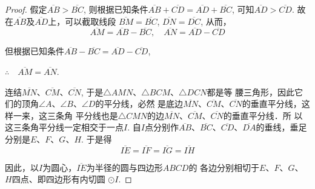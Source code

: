 \begin{figure}[htp]
    \centering
{}
    \caption{}
\end{figure}


\begin{proof}
    假定$\overline{AB}>\overline{BC}$, 则根据已知条件$\overline{AB}+\overline{CD}=\overline{AD}+
    \overline{BC}$, 可知$\overline{AD}>\overline{CD}$. 故在$\overline{AB}$及$\overline{AD}$上，可以截取线段
    $\overline{BM}=\overline{BC}$, $\overline{DN}=\overline{DC}$, 从而，
\[\overline{AM}=\overline{AB}-\overline{BC},\quad \overline{AN}=\overline{AD}-\overline{CD}\]

但根据已知条件$\overline{AB}-\overline{BC}=\overline{AD}-\overline{CD}$, 

$\therefore\quad \overline{AM}=\overline{AN}$.

连结$\overline{MN}$、$\overline{CM}$、$\overline{CN}$, 于是$\triangle AMN$、$\triangle BCM$、$\triangle DCN$都是等
腰三角形，因此它们的顶角$\angle A$、$\angle B$、$\angle D$的平分线，必然
是底边$\overline{MN}$、$\overline{CM}$、$\overline{CN}$的垂直平分线，这样一来，这三条角
平分线也是$\triangle CMN$的边$\overline{MN}$、$\overline{CM}$、$\overline{CN}$的垂直平分线．所
以这三条角平分线一定相交于一点$I$. 自$I$点分别作$\overline{AB}$、$\overline{BC}$、$\overline{CD}$、$\overline{DA}$的垂线，垂足分别是$E$、$F$、$G$、$H$. 于是得
\[\overline{IE}=\overline{IF}=\overline{IG}=\overline{IH}\]

因此，以$I$为圆心，$\overline{IE}$为半径的圆与四边形$ABCD$的
各边分别相切于$E$、$F$、$G$、$H$四点、即四边形有内切圆
$\odot I$. 
\end{proof}

